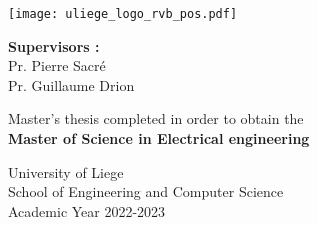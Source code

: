 \begin{titlepage}
    \centering
    
    \thispagestyle{empty}
    \vspace*{1cm}
        
    \Huge
    \textbf{\mytitle}
        
    \vspace{0.5cm}
    \LARGE
    \mysubtitle
        
    \vspace{1.5cm}
        
    {\bfseries \myname}
    
    \vfill
    
    \texttt{[image: uliege\_logo\_rvb\_pos.pdf]}
    
    \vfill
    
    \Large
    \textbf{Supervisors :}\\
    Pr. Pierre Sacr\'e\\
    Pr. Guillaume Drion
    \LARGE
        
    \vfill
        
    Master's thesis completed in order to obtain the\\
    \textbf{Master of Science in Electrical engineering}
        
    \vspace{0.8cm}
        
        
    \Large
    University of Liege\\
    School of Engineering and Computer Science\\
    Academic Year 2022-2023
            
\end{titlepage}
\restoregeometry
